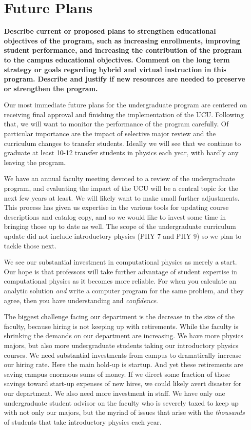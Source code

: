 \documentclass[12pt]{article}
\begin{document}
\newpage
\section{Future Plans}
{\bf Describe current or proposed plans to strengthen educational
objectives of the program, such as increasing enrollments, improving
student performance, and increasing the contribution of the program to
the campus educational objectives. Comment on the long term strategy
or goals regarding hybrid and virtual instruction in this
program. Describe and justify if new resources are needed to preserve
or strengthen the program.}

Our most immediate future plans for the undergraduate program are
centered on receiving final approval and finishing the implementation
of the UCU.  Following that, we will want to monitor the performance
of the program carefully.  Of particular importance are the impact of
selective major review and the curriculum changes to transfer
students.  Ideally we will see that we continue to graduate at least
10-12 transfer students in physics each year, with hardly any leaving
the program.

We have an annual faculty meeting devoted to a review of the
undergraduate program, and evaluating the impact of the UCU will be a
central topic for the next few years at least.  We will likely want to
make small further adjustments.  This process has given us expertise
in the various tools for updating course descriptions and catalog
copy, and so we would like to invest some time in bringing those up to
date as well.  The scope of the undergraduate curriculum update did
not include introductory physics (PHY 7 and PHY 9) so we plan to
tackle those next.

We see our substantial investment in computational physics as merely a
start.  Our hope is that professors will take further advantage of
student expertise in computational physics as it becomes more reliable.
For when you calculate an analytic solution {\em and} write a computer
program for the same problem, and they agree, then you have
understanding and {\em confidence}.

The biggest challenge facing our department is the decrease in the
size of the faculty, because hiring is not keeping up with
retirements.  While the faculty is shrinking the demands on our
department are increasing.  We have more physics majors, but also more
undergraduate students taking our introductory physics courses.  We
need substantial investments from campus to dramatically increase our
hiring rate.  Here the main hold-up is startup.  And yet these
retirements are saving campus enormous sums of money.  If we direct
some fraction of those savings toward start-up expenses of new hires,
we could likely avert disaster for our department.  We also need more
investment in staff.  We have only one undergraduate student advisor
on the faculty who is severely taxed to keep up with not only our
majors, but the myriad of issues that arise with the {\em thousands}
of students that take introductory physics each year.
\end{document}
